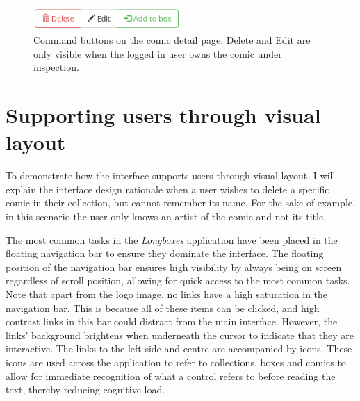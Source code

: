 \documentclass[fontsize=12pt,a4paper]{scrreprt}
\begin{document}
\begin{figure}[p]
  \centering
  \includegraphics[width=0.5\textwidth]{comic_command_buttons.png}
  \caption{
    Command buttons on the comic detail page. \textsf{Delete} and \textsf{Edit} are only visible when the logged in user owns the comic under inspection.
  }
  \label{fig:ComicCommandButtons}
\end{figure}

\FloatBarrier

\section{Supporting users through visual layout}


To demonstrate how the interface supports users through visual layout, I will explain the interface design rationale when a user wishes to delete a specific comic in their collection, but cannot remember its name. For the sake of example, in this scenario the user only knows an artist of the comic and not its title.


The most common tasks in the \emph{Longboxes} application have been placed in the floating navigation bar to ensure they dominate the interface. The floating position of the navigation bar ensures high visibility by always being on screen regardless of scroll position, allowing for quick access to the most common tasks. Note that apart from the logo image, no links have a high saturation in the navigation bar. This is because all of these items can be clicked, and high contrast links in this bar could distract from the main interface. However, the links' background brightens when underneath the cursor to indicate that they are interactive. The links to the left-side and centre are accompanied by icons. These icons are used across the application to refer to collections, boxes and comics to allow for immediate recognition of what a control refers to before reading the text, thereby reducing cognitive load.
\end{document}
